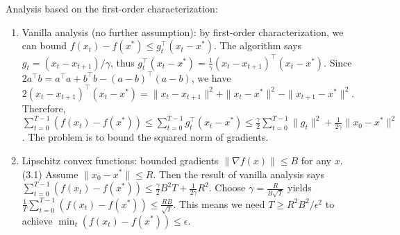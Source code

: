 Analysis based on the first-order characterization:
\begin{enumerate}
    \item Vanilla analysis (no further assumption): by first-order characterization, we can bound $f(x_t)-f(x^*) \le g_t^\top (x_t - x^*)$. The algorithm says $g_t = (x_t - x_{t+1}) / \gamma$, thus $g_t^\top (x_t - x^*) = \frac{1}{\gamma} (x_t - x_{t+1})^\top (x_t - x^*)$. Since $2a^\top b = a^\top a + b^\top b - (a-b)^\top (a-b)$, we have $2(x_t - x_{t+1})^\top (x_t - x^*) = \|x_t - x_{t+1}\|^2 + \|x_t - x^*\|^2 - \|x_{t+1} -x^*\|^2$. Therefore, $\sum_{t=0}^{T-1}(f(x_t)-f(x^*)) \le \sum_{t=0}^{T-1} g_t^\top (x_t - x^*) \le \frac{\gamma}{2}\sum_{t=0}^{T-1}\|g_t\|^2 + \frac{1}{2\gamma} \|x_0-x^*\|^2$.  The problem is to bound the squared norm of gradients.
    \item Lipschitz convex functions: bounded gradients $\|\nabla f(x)\| \le B$ for any $x$. (3.1) Assume $\|x_0 - x^*\| \le R$.  Then the result of vanilla analysis says $\sum_{t=0}^{T-1}(f(x_t)-f(x^*)) \le \frac{\gamma}{2}B^2 T + \frac{1}{2\gamma}R^2$. Choose $\gamma=\frac{R}{B\sqrt{T}}$ yields $\frac{1}{T}\sum_{t=0}^{T-1}(f(x_t)-f(x^*)) \le \frac{RB}{\sqrt{T}}$. This means we need $T\ge R^2B^2/\epsilon^2$ to achieve $\min_t (f(x_t)-f(x^*)) \le \epsilon$. 
\end{enumerate}

